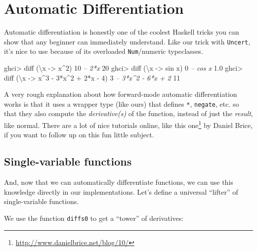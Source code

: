 \documentclass[]{article}
\newenvironment{Shaded}{}{}
\newcommand{\DecValTok}[1]{\textcolor[rgb]{0.25,0.63,0.44}{{#1}}}
\newcommand{\FloatTok}[1]{\textcolor[rgb]{0.25,0.63,0.44}{{#1}}}
\newcommand{\CommentTok}[1]{\textcolor[rgb]{0.38,0.63,0.69}{\textit{{#1}}}}
\newcommand{\OtherTok}[1]{\textcolor[rgb]{0.00,0.44,0.13}{{#1}}}
\newcommand{\FunctionTok}[1]{\textcolor[rgb]{0.02,0.16,0.49}{{#1}}}
\newcommand{\NormalTok}[1]{{#1}}
\renewcommand{\href}[2]{#2\footnote{\url{#1}}}
\begin{document}
\section{Automatic Differentiation}\label{automatic-differentiation}

Automatic differentiation is honestly one of the coolest Haskell tricks you can
show that any beginner can immediately understand. Like our trick with
\texttt{Uncert}, it's nice to use because of its overloaded \texttt{Num}/numeric
typeclasses.

\begin{Shaded}
\begin{Highlighting}[]
\NormalTok{ghci}\FunctionTok{>} \NormalTok{diff (\textbackslash{}x }\OtherTok{->} \NormalTok{x}\FunctionTok{^}\DecValTok{2}\NormalTok{) }\DecValTok{10}       \CommentTok{-- 2*x}
\DecValTok{20}
\NormalTok{ghci}\FunctionTok{>} \NormalTok{diff (\textbackslash{}x }\OtherTok{->} \NormalTok{sin x) }\DecValTok{0}      \CommentTok{-- cos x}
\FloatTok{1.0}
\NormalTok{ghci}\FunctionTok{>} \NormalTok{diff (\textbackslash{}x }\OtherTok{->} \NormalTok{x}\FunctionTok{^}\DecValTok{3} \FunctionTok{-} \DecValTok{3}\FunctionTok{*}\NormalTok{x}\FunctionTok{^}\DecValTok{2} \FunctionTok{+} \DecValTok{2}\FunctionTok{*}\NormalTok{x }\FunctionTok{-} \DecValTok{4}\NormalTok{) }\DecValTok{3}  \CommentTok{-- 3*x^2 - 6*x + 2}
\DecValTok{11}
\end{Highlighting}
\end{Shaded}

A very rough explanation about how forward-mode automatic differentiation works
is that it uses a wrapper type (like ours) that defines \texttt{*},
\texttt{negate}, etc. so that they also compute the \emph{derivative(s)} of the
function, instead of just the \emph{result}, like normal. There are a lot of
nice tutorials online, like \href{http://www.danielbrice.net/blog/10/}{this one}
by Daniel Brice, if you want to follow up on this fun little subject.

\subsection{Single-variable functions}\label{single-variable-functions}

And, now that we can automatically differentiate functions, we can use this
knowledge directly in our implementations. Let's define a universal ``lifter''
of single-variable functions.

We use the function \texttt{diffs0} to get a ``tower'' of derivatives:
\end{document}
